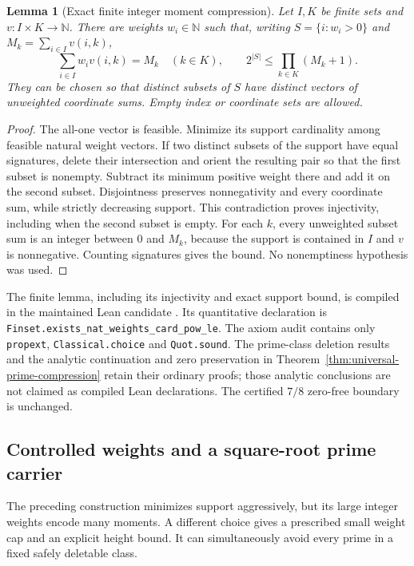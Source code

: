 \documentclass[11pt]{article}
\newtheorem{lemma}[theorem]{Lemma}
\theoremstyle{definition}
\begin{document}
\begin{lemma}[Exact finite integer moment compression]
\label{lem:integer-moment-compression}
Let $I,K$ be finite sets and $v:I\times K\to\mathbb N$.
There are weights $w_i\in\mathbb N$ such that, writing
$S=\{i:w_i>0\}$ and $M_k=\sum_{i\in I}v(i,k)$,
\[
 \sum_{i\in I}w_iv(i,k)=M_k\quad(k\in K),
 \qquad 2^{|S|}\le\prod_{k\in K}(M_k+1).
\]
They can be chosen so that distinct subsets of $S$ have
distinct vectors of unweighted coordinate sums.
Empty index or coordinate sets are allowed.
\end{lemma}

\begin{proof}
The all-one vector is feasible. Minimize its support
cardinality among feasible natural weight vectors. If two
distinct subsets of the support have equal signatures,
delete their intersection and orient the resulting pair
so that the first subset is nonempty. Subtract its minimum
positive weight there and add it on the second subset.
Disjointness preserves nonnegativity and every coordinate
sum, while strictly decreasing support. This contradiction
proves injectivity, including when the second subset is empty.
For each $k$, every unweighted subset sum is an integer
between $0$ and $M_k$, because the support is contained in $I$
and $v$ is nonnegative. Counting signatures gives the bound.
No nonemptiness hypothesis was used.
\end{proof}

The finite lemma, including its injectivity and exact
support bound, is compiled in the maintained Lean candidate
.
Its quantitative declaration is
\texttt{Finset.exists\_nat\_weights\_card\_pow\_le}.
The axiom audit contains only \texttt{propext},
\texttt{Classical.choice} and \texttt{Quot.sound}.
The prime-class deletion results and the analytic continuation
and zero preservation in
Theorem~\ref{thm:universal-prime-compression} retain their
ordinary proofs; those analytic conclusions are not claimed
as compiled Lean declarations.
The certified $7/8$ zero-free boundary is unchanged.

\subsection{Controlled weights and a square-root prime carrier}
\label{sec:controlled-prime-carrier}

The preceding construction minimizes support aggressively, but
its large integer weights encode many moments. A different
choice gives a prescribed small weight cap and an explicit
height bound. It can simultaneously avoid every prime in a
fixed safely deletable class.
\end{document}

